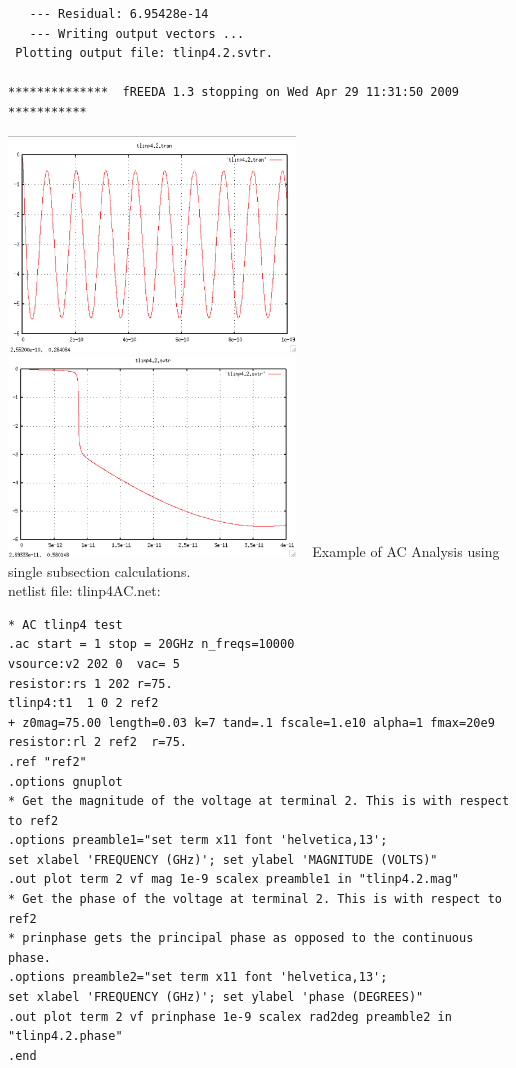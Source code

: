 \documentclass{article}
\begin{document}
{\begin{verbatim}
   --- Residual: 6.95428e-14
   --- Writing output vectors ...
 Plotting output file: tlinp4.2.svtr.

**************  fREEDA 1.3 stopping on Wed Apr 29 11:31:50 2009  ***********
\end{verbatim}
\hspace*{\fill}\includegraphics[width=3in]{tlinp4.2.svtr.eps}\hfill
\includegraphics[width=3in]{tlinp4.2.svtr.z.eps}\hspace*{\fill}
~
\myThickLine
Example of AC Analysis using single subsection calculations.\\
netlist file: tlinp4AC.net:
\begin{verbatim}
* AC tlinp4 test
.ac start = 1 stop = 20GHz n_freqs=10000
vsource:v2 202 0  vac= 5
resistor:rs 1 202 r=75.
tlinp4:t1  1 0 2 ref2
+ z0mag=75.00 length=0.03 k=7 tand=.1 fscale=1.e10 alpha=1 fmax=20e9
resistor:rl 2 ref2  r=75.
.ref "ref2"
.options gnuplot
* Get the magnitude of the voltage at terminal 2. This is with respect to ref2
.options preamble1="set term x11 font 'helvetica,13';
set xlabel 'FREQUENCY (GHz)'; set ylabel 'MAGNITUDE (VOLTS)"
.out plot term 2 vf mag 1e-9 scalex preamble1 in "tlinp4.2.mag"
* Get the phase of the voltage at terminal 2. This is with respect to ref2
* prinphase gets the principal phase as opposed to the continuous phase.
.options preamble2="set term x11 font 'helvetica,13';
set xlabel 'FREQUENCY (GHz)'; set ylabel 'phase (DEGREES)"
.out plot term 2 vf prinphase 1e-9 scalex rad2deg preamble2 in "tlinp4.2.phase"
.end
\end{verbatim}

}
\end{document}
